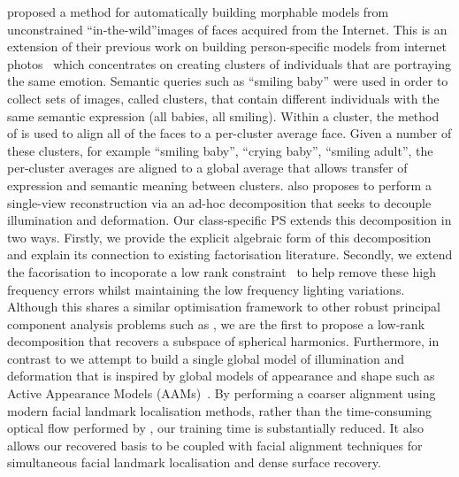 \citet{KemelmacherShlizerman:2013iv} proposed a method for automatically
building morphable models from unconstrained ``in-the-wild''images of faces
acquired from the Internet. This is an extension of their previous work
on building person-specific models from internet photos~\cite{kemelmacher2011face}
which concentrates on creating clusters of individuals that are portraying
the same emotion. Semantic queries such as ``smiling baby'' were used in order
to collect sets of images, called clusters, that contain different individuals
with the same semantic expression (all babies, all smiling). 
Within a cluster, the method of
\citet{kemelmacher2012collection} is used to align all of the faces to a
per-cluster average face. Given a number of these clusters, for example 
``smiling baby'', ``crying baby'', ``smiling adult'', the per-cluster averages
are aligned to a global average that allows transfer of expression and
semantic meaning between clusters. \citet{KemelmacherShlizerman:2013iv} also
proposes to perform a single-view reconstruction via an ad-hoc decomposition
that seeks to decouple illumination and deformation. Our class-specific
PS extends this decomposition in two ways. Firstly, we
provide the explicit algebraic form of this decomposition and explain its
connection to existing factorisation literature. Secondly, we extend the
facorisation to incoporate a low rank
constraint~\cite{candes2011robust,peng2012rasl,sagonas2014raps,cheng2013rank,%
wu2010robust,lu2013uncalibrated} to help remove these high frequency errors
whilst maintaining the low frequency lighting variations. Although this shares a
similar optimisation framework to other
robust principal component analysis problems such as
\cite{candes2011robust,peng2012rasl,wu2010robust,lu2013uncalibrated},
we are the first to propose a low-rank decomposition that recovers a subspace
of spherical harmonics. Furthermore, in contrast to \citet{KemelmacherShlizerman:2013iv}
we attempt to build a single global model of illumination and deformation
that is inspired by global models of appearance and shape such as
Active Appearance Models (AAMs)~\cite{cootes2001active}. By performing a coarser
alignment using modern facial landmark localisation methods, rather than
the time-consuming optical flow performed by \citet{KemelmacherShlizerman:2013iv},
our training time is substantially reduced.
It also allows our recovered basis to be coupled with facial alignment
techniques for simultaneous facial landmark localisation and dense surface
recovery.


